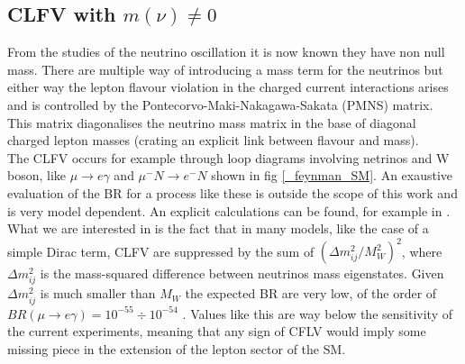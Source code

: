 \documentclass[12pt,a4paper,openright, oneside, titlepage]{book} %
\begin{document}
\subsection{CLFV with $m(\nu)\neq 0$}
From the studies of the neutrino oscillation it is now known they have non null mass. There are multiple way of introducing a mass term for the neutrinos but either way the lepton flavour violation in the charged current interactions arises and is controlled by the Pontecorvo-Maki-Nakagawa-Sakata (PMNS) matrix. This matrix diagonalises the neutrino mass matrix in the base of diagonal charged lepton masses (crating an explicit link between flavour and mass).\\
The CLFV occurs for example through loop diagrams involving netrinos and W boson, like $\mu\rightarrow e\gamma$ and $\mu^-N \rightarrow e^-N$ shown in fig \ref{_feynman_SM}.
An exaustive evaluation of the BR for a process like these is outside the scope of this work and is very model dependent. An explicit calculations can be found, for example in \cite{signorelli}. \\
What we are interested in is the fact that in many models, like the case of a simple Dirac term, CLFV are suppressed by the sum of $(\Delta m_{ij}^2/M_W^2)^2$, where $\Delta m_{ij}^2$ is the mass-squared difference between neutrinos mass eigenstates. Given $\Delta m_{ij}^2$ is much smaller than $M_W$ the expected BR are very low, of the order of $BR(\mu\rightarrow e\gamma)= 10^{-55}\div10^{-54}$ \cite {Petcov}. Values like this are way below the sensitivity of the current experiments, meaning that any sign of CFLV would imply some missing piece in the extension of the lepton sector of the SM.\\\\
\end{document}
